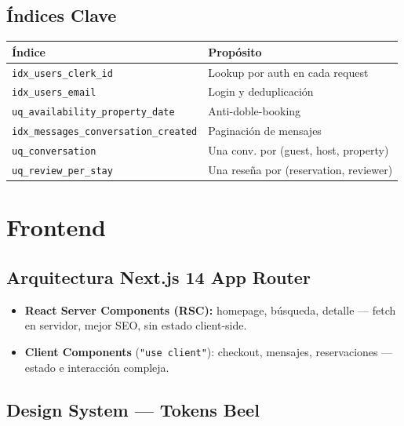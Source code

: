 \documentclass[12pt,a4paper]{report}
\begin{document}
\section{\'Indices Clave}

\begin{center}
\begin{tabular}{L{5.5cm} L{6cm}}
\toprule
\textbf{\'Indice} & \textbf{Prop\'osito} \\
\midrule
\texttt{idx\_users\_clerk\_id} & Lookup por auth en cada request \\
\texttt{idx\_users\_email} & Login y deduplicaci\'on \\
\texttt{uq\_availability\_property\_date} & Anti-doble-booking \\
\texttt{idx\_messages\_conversation\_created} & Paginaci\'on de mensajes \\
\texttt{uq\_conversation} & Una conv. por (guest, host, property) \\
\texttt{uq\_review\_per\_stay} & Una rese\~na por (reservation, reviewer) \\
\bottomrule
\end{tabular}
\end{center}

\chapter{Frontend}

\section{Arquitectura Next.js 14 App Router}

\begin{itemize}[leftmargin=*]
  \item \textbf{React Server Components (RSC):} homepage, b\'usqueda, detalle ---
        fetch en servidor, mejor SEO, sin estado client-side.
  \item \textbf{Client Components} (\texttt{"use client"}): checkout, mensajes,
        reservaciones --- estado e interacci\'on compleja.
\end{itemize}

\section{Design System --- Tokens Beel}
\end{document}

